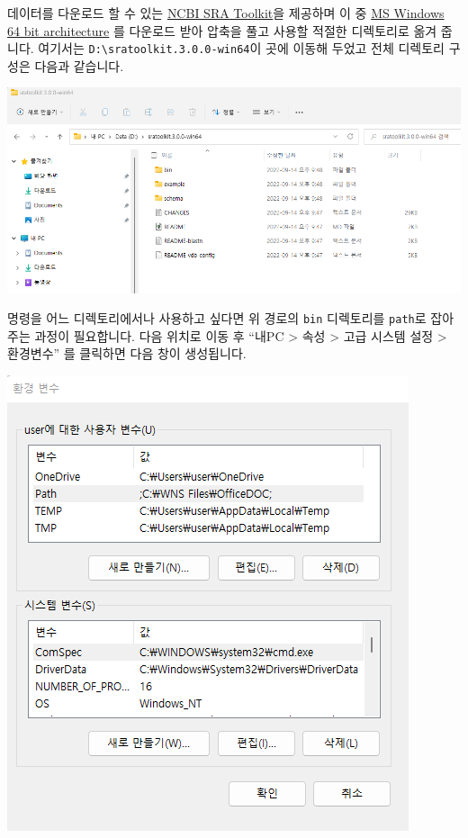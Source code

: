 \documentclass[
]{book}
\begin{document}
데이터를 다운로드 할 수 있는 \href{https://github.com/ncbi/sra-tools/wiki/01.-Downloading-SRA-Toolkit}{NCBI SRA Toolkit}을 제공하며 이 중 \href{https://ftp-trace.ncbi.nlm.nih.gov/sra/sdk/3.0.0/sratoolkit.3.0.0-win64.zip}{MS Windows 64 bit architecture} 를 다운로드 받아 압축을 풀고 사용할 적절한 디렉토리로 옮겨 줍니다. 여기서는 \texttt{D:\textbackslash{}sratoolkit.3.0.0-win64}이 곳에 이동해 두었고 전체 디렉토리 구성은 다음과 같습니다.

\includegraphics[width=6.25in,height=\textheight]{images/12/env0.png}

명령을 어느 디렉토리에서나 사용하고 싶다면 위 경로의 \texttt{bin} 디렉토리를 \texttt{path}로 잡아주는 과정이 필요합니다. 다음 위치로 이동 후 ``내PC \textgreater{} 속성 \textgreater{} 고급 시스템 설정 \textgreater{} 환경변수'' 를 클릭하면 다음 창이 생성됩니다.

\includegraphics{images/12/env1.png}
\end{document}
